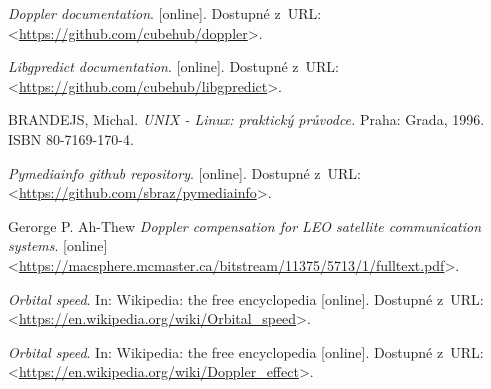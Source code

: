 \begin{literatura}{99}
    \emph{Doppler documentation}. [online].
    Dostupné z~URL:\\
    <\url{https://github.com/cubehub/doppler}>.

    \emph{Libgpredict documentation}. [online].
    Dostupné z~URL:\\
    <\url{https://github.com/cubehub/libgpredict}>.

    BRANDEJS, Michal.
    \emph{UNIX - Linux: praktický průvodce.} Praha: Grada, 1996. ISBN 80-7169-170-4.

    \emph{Pymediainfo github repository}. [online].
    Dostupné z~URL:\\
    <\url{https://github.com/sbraz/pymediainfo}>.

    Gerorge P. Ah-Thew
    \emph{Doppler compensation for LEO satellite communication systems}. [online]
    <\url{https://macsphere.mcmaster.ca/bitstream/11375/5713/1/fulltext.pdf}>.

    \emph{Orbital speed}. In: Wikipedia: the free encyclopedia\/ [online].
    Dostupné z~URL:\\
    <\url{https://en.wikipedia.org/wiki/Orbital_speed}>.

    \emph{Orbital speed}. In: Wikipedia: the free encyclopedia\/ [online].
    Dostupné z~URL:\\
    <\url{https://en.wikipedia.org/wiki/Doppler_effect}>.



\end{literatura}
